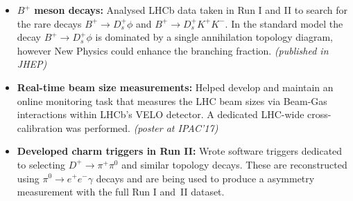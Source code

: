 \documentclass[11pt,a4paper]{article}
\begin{document}
\begin{itemize}
\setlength\itemsep{0em}
\item {\bf $B^{+}$ meson decays:} Analysed LHCb data taken in Run I and II  to search for the rare decays $B^{+} \to D_{s}^{+} \phi$ and $B^{+} \to D_{s}^{+} K^{+} K^{-}$. In the standard model the decay $B^{+} \to D_{s}^{+} \phi$ is dominated by a single annihilation topology diagram, however New Physics could enhance the branching fraction. \textit{(published in JHEP)}


\item {\bf Real-time beam size measurements:} Helped develop and maintain an online monitoring task that measures the LHC beam sizes via Beam-Gas interactions within LHCb's VELO detector. A dedicated LHC-wide cross-calibration was performed. \textit{(poster at IPAC'17)}

\item {\bf Developed charm triggers in Run II:} Wrote software triggers dedicated to selecting $D^{+} \to \pi^{+} \pi^{0}$ and similar topology decays. These are reconstructed using $\pi^{0} \to e^{+} e^{-} \gamma$ decays and are being used to produce a \CP asymmetry measurement with the full Run I and~II dataset.
\end{itemize}
\end{document}
